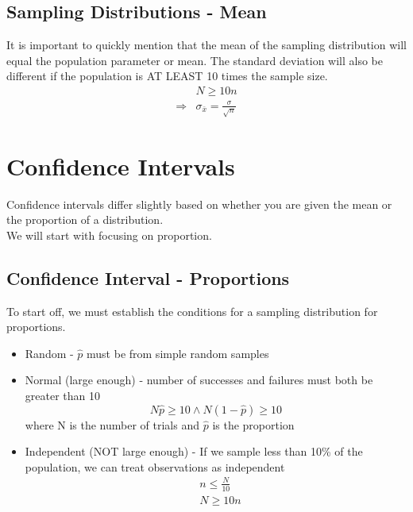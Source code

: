\documentclass{article}
\theoremstyle{definition}
\theoremstyle{remark}
\begin{document}
\subsection{Sampling Distributions - Mean}
It is important to quickly mention that the mean of the sampling distribution will equal the population parameter or mean.
The standard deviation will also be different if the population is AT LEAST 10 times the sample size.
\begin{equation}
  \begin{aligned}
    & N \geq 10n \\
    \Rightarrow & \sigma_{\bar{x}} = \frac{\sigma}{\sqrt{n}}
  \end{aligned}
\end{equation}

\section{Confidence Intervals}
Confidence intervals differ slightly based on whether you are given the mean or the proportion of a distribution.\\
We will start with focusing on proportion.

\subsection{Confidence Interval - Proportions}

To start off, we must establish the conditions for a sampling distribution for proportions.
\begin{itemize}
  \item Random - $\hat{p}$ must be from simple random samples
  \item Normal (large enough) - number of successes and failures must both be greater than 10
  \begin{equation}
    N\hat{p} \geq 10 \land N(1-\hat{p}) \geq 10
  \end{equation}
  where N is the number of trials and $\hat{p}$ is the proportion
  \item Independent (NOT large enough) - If we sample less than 10\% of the population, we can treat observations as independent\\
  \begin{equation}
    \begin{aligned}
      & n \leq \frac{N}{10} \\
      & N \geq 10n
    \end{aligned}
  \end{equation}
\end{itemize}
\end{document}
